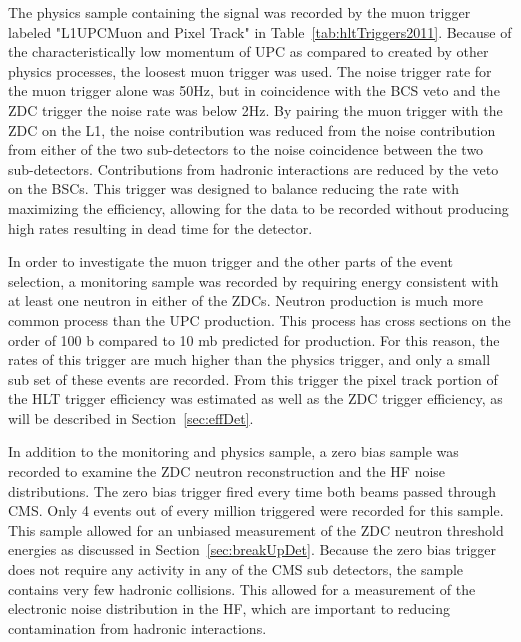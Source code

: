       The physics sample containing the \JPsi{} signal was recorded by the muon 
        trigger labeled "L1UPCMuon and Pixel Track" in 
        Table~\ref{tab:hltTriggers2011}. 
      Because of the characteristically low momentum of UPC \JPsi{} as compared
        to \JPsi{} created by other physics processes, the loosest muon 
        trigger was used.
      The noise trigger rate for the muon trigger alone was 50Hz, but in 
        coincidence with the BCS veto and the ZDC trigger the noise rate was
        below 2Hz. 
      By pairing the muon trigger with the ZDC on the L1, the noise contribution
        was reduced from the noise contribution from either of the two 
        sub-detectors to the noise coincidence between the two sub-detectors. 
      Contributions from hadronic interactions are reduced by the veto on the 
        BSCs.
      This trigger was designed to balance reducing the rate with maximizing 
        the efficiency, allowing for the data to be recorded without 
        producing high rates resulting in dead time for the detector.  
      
      In order to investigate the muon trigger and the other parts of the event 
        selection, a monitoring sample was recorded by requiring energy 
        consistent with at least one neutron in either of the ZDCs.
      Neutron production is much more common process than the UPC \JPsi{} 
        production.
      This process has cross sections on the order of 100 b compared
        to 10 mb predicted for \JPsi{} production. 
      For this reason, the rates of this trigger are much higher than the physics
        trigger, and only a small sub set of these events are recorded.
      From this trigger the pixel track portion of the HLT trigger efficiency 
        was estimated as well as the ZDC trigger efficiency, as will be described 
        in Section~\ref{sec:effDet}. 
  
      In addition to the monitoring and physics sample, a zero bias sample was 
        recorded to examine the ZDC neutron reconstruction and the HF noise 
        distributions. 
      The zero bias trigger fired every time both beams passed through CMS. 
      Only 4 events out of every million triggered were recorded for this sample. 
      This sample allowed for an unbiased measurement of the ZDC neutron 
        threshold energies as discussed in Section~\ref{sec:breakUpDet}. 
      Because the zero bias trigger does not require any activity in any of the
        CMS sub detectors, the sample contains very few hadronic collisions. 
      This allowed for a measurement of the electronic noise distribution in
        the HF, which are important to reducing contamination from hadronic
        interactions.
  
